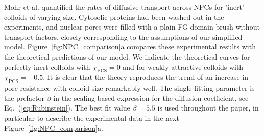 \documentclass[12pt, a4paper]{article}
\begin{document}
Mohr et al. quantified the rates of diffusive transport across NPCs for 'inert' colloids of varying size.
Cytosolic proteins had been washed out in the experiments, and nuclear pores were filled with a plain FG domain brush without transport factors, closely corresponding to the assumptions of our simplified model. Figure~\ref{fig:NPC_comparison}a compares these experimental results with the theoretical predictions of our model. We indicate the theoretical curves for perfectly inert colloids with $\chi_{\text{PCS}} = 0$ and for weakly attractive colloids with $\chi_{\text{PCS}} = -0.5$. It is clear that the theory reproduces the trend of an increase in pore resistance with colloid size remarkably well. The single fitting parameter is the prefactor $\beta$ in the scaling-based expression for the diffusion coefficient, see Eq.~(\ref{eq:Rubinstein}). The best fit value $\beta=5.5$ is used throughout the paper, in particular to describe the experimental data in the next Figure~\ref{fig:NPC_comparison}a.



\end{document}
